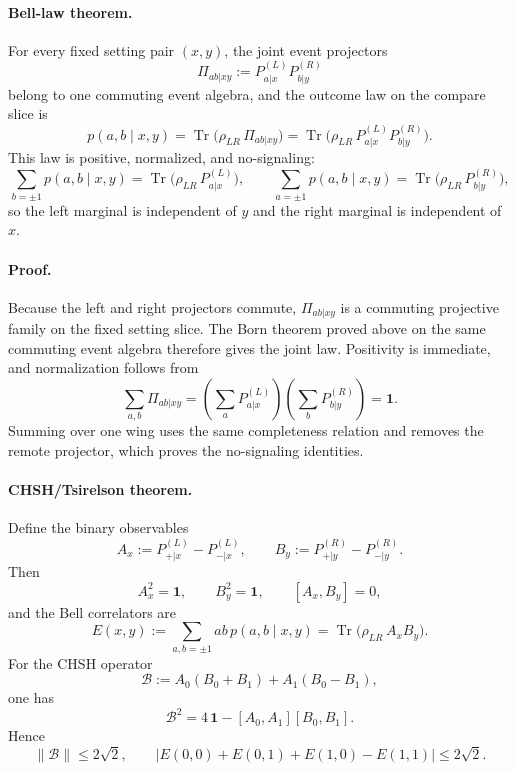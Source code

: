 \documentclass[11pt]{article}
\begin{document}
\paragraph{Bell-law theorem.}
For every fixed setting pair \((x,y)\), the joint event projectors
\[
\Pi_{ab|xy}:=P_{a|x}^{(L)}P_{b|y}^{(R)}
\]
belong to one commuting event algebra, and the outcome law on the compare slice is
\begin{equation}
p(a,b\mid x,y)
=
\operatorname{Tr}\!\bigl(\rho_{LR}\,\Pi_{ab|xy}\bigr)
=
\operatorname{Tr}\!\bigl(\rho_{LR}\,P_{a|x}^{(L)}P_{b|y}^{(R)}\bigr).
\end{equation}
This law is positive, normalized, and no-signaling:
\begin{equation}
\sum_{b=\pm1} p(a,b\mid x,y)
=
\operatorname{Tr}\!\bigl(\rho_{LR}\,P_{a|x}^{(L)}\bigr),
\qquad
\sum_{a=\pm1} p(a,b\mid x,y)
=
\operatorname{Tr}\!\bigl(\rho_{LR}\,P_{b|y}^{(R)}\bigr),
\end{equation}
so the left marginal is independent of \(y\) and the right marginal is independent of \(x\).

\paragraph{Proof.}
Because the left and right projectors commute, \(\Pi_{ab|xy}\) is a commuting projective family on
the fixed setting slice. The Born theorem proved above on the same commuting event algebra
therefore gives the joint law. Positivity is immediate, and normalization follows from
\[
\sum_{a,b}\Pi_{ab|xy}
=
\left(\sum_a P_{a|x}^{(L)}\right)\left(\sum_b P_{b|y}^{(R)}\right)
=
\mathbf 1.
\]
Summing over one wing uses the same completeness relation and removes the remote projector, which
proves the no-signaling identities.

\paragraph{CHSH/Tsirelson theorem.}
Define the binary observables
\[
A_x:=P_{+|x}^{(L)}-P_{-|x}^{(L)},
\qquad
B_y:=P_{+|y}^{(R)}-P_{-|y}^{(R)}.
\]
Then
\[
A_x^2=\mathbf 1,
\qquad
B_y^2=\mathbf 1,
\qquad
[A_x,B_y]=0,
\]
and the Bell correlators are
\begin{equation}
E(x,y)
:=
\sum_{a,b=\pm1}ab\,p(a,b\mid x,y)
=
\operatorname{Tr}\!\bigl(\rho_{LR}\,A_xB_y\bigr).
\end{equation}
For the CHSH operator
\begin{equation}
\mathcal B
:=
A_0(B_0+B_1)+A_1(B_0-B_1),
\end{equation}
one has
\begin{equation}
\mathcal B^2
=
4\,\mathbf 1-[A_0,A_1][B_0,B_1].
\end{equation}
Hence
\begin{equation}
\|\mathcal B\|
\le
2\sqrt 2,
\qquad
\bigl|E(0,0)+E(0,1)+E(1,0)-E(1,1)\bigr|
\le
2\sqrt 2.
\end{equation}
\end{document}
